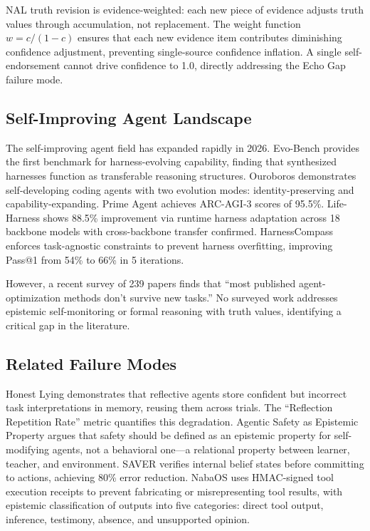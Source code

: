 \documentclass{article}
\begin{document}
NAL truth revision is evidence-weighted: each new piece of evidence adjusts truth values through accumulation, not replacement. The weight function $w = c/(1-c)$ ensures that each new evidence item contributes diminishing confidence adjustment, preventing single-source confidence inflation. A single self-endorsement cannot drive confidence to 1.0, directly addressing the Echo Gap failure mode.

\subsection{Self-Improving Agent Landscape}

The self-improving agent field has expanded rapidly in 2026. Evo-Bench \citep{evobench} provides the first benchmark for harness-evolving capability, finding that synthesized harnesses function as transferable reasoning structures. Ouroboros \citep{ouroboros} demonstrates self-developing coding agents with two evolution modes: identity-preserving and capability-expanding. Prime Agent \citep{primeagent} achieves ARC-AGI-3 scores of 95.5\%. Life-Harness \citep{lifeharness} shows 88.5\% improvement via runtime harness adaptation across 18 backbone models with cross-backbone transfer confirmed. HarnessCompass \citep{harnesscompass} enforces task-agnostic constraints to prevent harness overfitting, improving Pass@1 from 54\% to 66\% in 5 iterations.

However, a recent survey of 239 papers \citep{sisurvey} finds that ``most published agent-optimization methods don't survive new tasks.'' No surveyed work addresses epistemic self-monitoring or formal reasoning with truth values, identifying a critical gap in the literature.

\subsection{Related Failure Modes}

Honest Lying \citep{honestlying} demonstrates that reflective agents store confident but incorrect task interpretations in memory, reusing them across trials. The ``Reflection Repetition Rate'' metric quantifies this degradation. Agentic Safety as Epistemic Property \citep{agenticsafety} argues that safety should be defined as an epistemic property for self-modifying agents, not a behavioral one—a relational property between learner, teacher, and environment. SAVER \citep{saver} verifies internal belief states before committing to actions, achieving 80\% error reduction. NabaOS \citep{nabaos} uses HMAC-signed tool execution receipts to prevent fabricating or misrepresenting tool results, with epistemic classification of outputs into five categories: direct tool output, inference, testimony, absence, and unsupported opinion.
\end{document}
